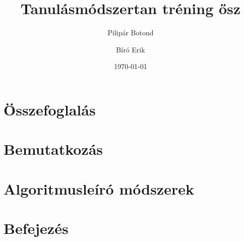 \documentclass[12pt]{article}
\title{Tanulásmódszertan tréning ősz}
\author{Pilipár Botond}
\author{Bíró Erik}
\date{\today}
\begin{document}


\tableofcontents

\section{Összefoglalás}


\section{Bemutatkozás}


\section{Algoritmusleíró módszerek}


\section{Befejezés}

\end{document}
